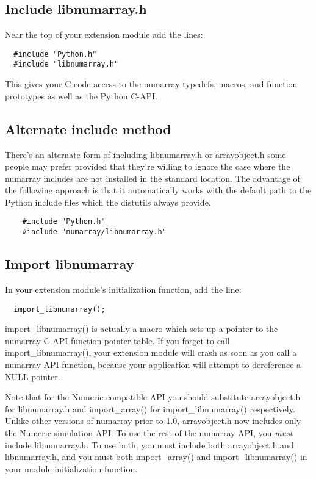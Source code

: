 \subsection{Include libnumarray.h}
  Near the top of your extension module add the lines:
\begin{verbatim}
  #include "Python.h"
  #include "libnumarray.h"
\end{verbatim} 
  This gives your C-code access to the numarray typedefs, macros, and function
  prototypes as well as the Python C-API.

  \subsection{Alternate include method}
  There's an alternate form of including libnumarray.h or arrayobject.h some
  people may prefer provided that they're willing to ignore the case where the
  numarray includes are not installed in the standard location.  The advantage
  of the following approach is that it automatically works with the default
  path to the Python include files which the distutils always provide.
  \begin{verbatim}
    #include "Python.h"
    #include "numarray/libnumarray.h"
  \end{verbatim}

\subsection{Import libnumarray}
  In your extension module's initialization function, add the line:
\begin{verbatim}
  import_libnumarray();
\end{verbatim} 
  
  import_libnumarray() is actually a macro which sets up a pointer to the
  numarray C-API function pointer table. If you forget to call
  import_libnumarray(), your extension module will crash as soon as you call a
  numarray API function, because your application will attempt to dereference a
  NULL pointer.

  Note that for the Numeric compatible API you should substitute arrayobject.h
  for libnumarray.h and import_array() for import_libnumarray() respectively.
  Unlike other versions of numarray prior to 1.0, arrayobject.h now includes
  only the Numeric simulation API.  To use the rest of the numarray API, you
  \emph{must} include libnumarray.h.  To use both, you must include both
  arrayobject.h and libnumarray.h, and you must both import_array() and
  import_libnumarray() in your module initialization function.

